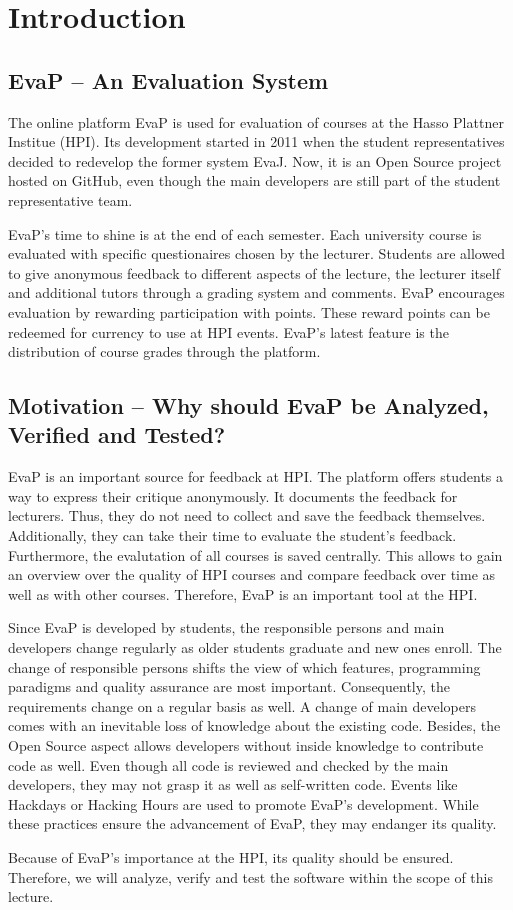 \section{Introduction}

\subsection{EvaP -- An Evaluation System}
The online platform EvaP is used for evaluation of courses at the Hasso Plattner Institue (HPI). 
Its development started in 2011 when the student representatives decided to redevelop the former system EvaJ.
Now, it is an Open Source project hosted on GitHub, even though the main developers are still part of the student representative team.

EvaP's time to shine is at the end of each semester. 
Each university course is evaluated with specific questionaires chosen by the lecturer. 
Students are allowed to give anonymous feedback to different aspects of the lecture, the lecturer itself and additional tutors through a grading system and comments.
EvaP encourages evaluation by rewarding participation with points. 
These reward points can be redeemed for currency to use at HPI events.
EvaP's latest feature is the distribution of course grades through the platform.

\subsection{Motivation -- Why should EvaP be Analyzed, Verified and Tested?}
EvaP is an important source for feedback at HPI. 
The platform offers students a way to express their critique anonymously.
It documents the feedback for lecturers.
Thus, they do not need to collect and save the feedback themselves.
Additionally, they can take their time to evaluate the student's feedback.
Furthermore, the evalutation of all courses is saved centrally.
This allows to gain an overview over the quality of HPI courses and compare feedback over time as well as with other courses.
Therefore, EvaP is an important tool at the HPI.

Since EvaP is developed by students, the responsible persons and main developers change regularly as older students graduate and new ones enroll.
The change of responsible persons shifts the view of which features, programming paradigms and quality assurance are most important.
Consequently, the requirements change on a regular basis as well.
A change of main developers comes with an inevitable loss of knowledge about the existing code.
Besides, the Open Source aspect allows developers without inside knowledge to contribute code as well.
Even though all code is reviewed and checked by the main developers, they may not grasp it as well as self-written code.
Events like Hackdays or Hacking Hours are used to promote EvaP's development.
While these practices ensure the advancement of EvaP, they may endanger its quality.

Because of EvaP's importance at the HPI, its quality should be ensured.
Therefore, we will analyze, verify and test the software within the scope of this lecture.
